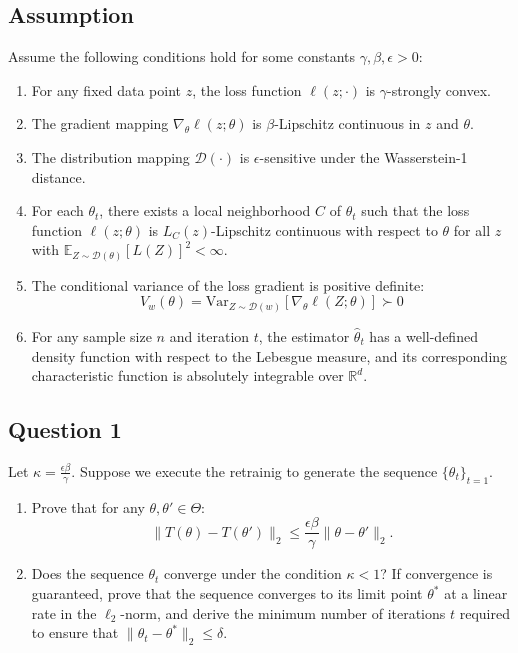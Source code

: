 \documentclass[../../../main.tex]{subfiles}
\begin{document}
\begin{msbproblem}
\begin{problemstatement}
\subsection*{Assumption}
Assume the following conditions hold for some constants $\gamma, \beta, \epsilon > 0$:
\begin{enumerate}
    \item For any fixed data point $z$, the loss function $\ell(z; \cdot)$ is $\gamma$-strongly convex.
    \item The gradient mapping $\nabla_\theta \ell(z; \theta)$ is $\beta$-Lipschitz continuous in $z$ and $\theta$.
    \item The distribution mapping $\mathcal{D}(\cdot)$ is $\epsilon$-sensitive under the Wasserstein-1 distance.
    \item For each $\theta_t$, there exists a local neighborhood $C$ of $\theta_t$ such that the loss function $\ell(z; \theta)$ is $L_C(z)$-Lipschitz continuous with respect to $\theta$ for all $z$ with $\mathbb{E}_{Z \sim \mathcal{D}(\theta)}[L(Z)]^2 < \infty$.
    \item The conditional variance of the loss gradient is positive definite:
    \[
    V_{w}(\theta) = \text{Var}_{Z \sim \mathcal{D}(w)} \left[ \nabla_\theta \ell(Z; \theta) \right] \succ 0
    \]
    \item For any sample size $n$ and iteration $t$, the estimator $\widehat{\theta}_t$ has a well-defined density function with respect to the Lebesgue measure, and its corresponding characteristic function is absolutely integrable over $\mathbb{R}^d$.
\end{enumerate}

\subsection*{Question 1}
Let $\kappa = \frac{\epsilon\beta}{\gamma}$. Suppose we execute the retrainig to generate the sequence $\{\theta_{t}\}_{t=1}$.
\begin{enumerate}
    \item Prove that for any $\theta, \theta' \in \Theta$:
    \[
    \|T(\theta) - T(\theta')\|_2 \le \frac{\epsilon\beta}{\gamma} \|\theta - \theta'\|_2.
    \]
    \item Does the sequence $\theta_t$ converge under the condition $\kappa < 1$? If convergence is guaranteed, prove that the sequence converges to its limit point $\theta^*$ at a linear rate in the $\ell_2$-norm, and derive the minimum number of iterations $t$ required to ensure that $\|\theta_t - \theta^*\|_2 \le \delta$.
\end{enumerate}


\end{problemstatement}
\end{msbproblem}
\end{document}
